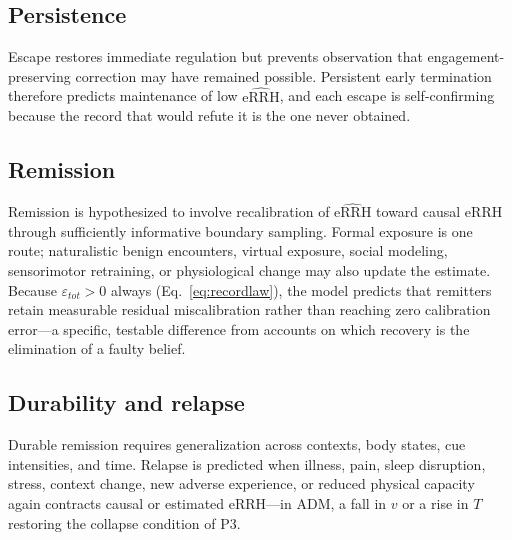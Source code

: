 \documentclass[9pt,twocolumn]{article}
\newcommand{\eRRHhat}{\widehat{\mathrm{eRRH}}}
\begin{document}
\subsection{Persistence}
Escape restores immediate regulation but prevents observation that engagement-preserving correction may have remained possible. Persistent early termination therefore predicts maintenance of low $\eRRHhat$, and each escape is self-confirming because the record that would refute it is the one never obtained.

\subsection{Remission}
Remission is hypothesized to involve recalibration of $\eRRHhat$ toward causal eRRH through sufficiently informative boundary sampling. Formal exposure is one route; naturalistic benign encounters, virtual exposure, social modeling, sensorimotor retraining, or physiological change may also update the estimate. Because $\varepsilon_{tot}>0$ always (Eq.~\ref{eq:recordlaw}), the model predicts that remitters retain measurable residual miscalibration rather than reaching zero calibration error---a specific, testable difference from accounts on which recovery is the elimination of a faulty belief.

\subsection{Durability and relapse}
Durable remission requires generalization across contexts, body states, cue intensities, and time. Relapse is predicted when illness, pain, sleep disruption, stress, context change, new adverse experience, or reduced physical capacity again contracts causal or estimated eRRH---in ADM, a fall in $v$ or a rise in $T$ restoring the collapse condition of P3.
\end{document}
